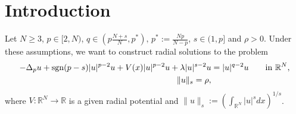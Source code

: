 \documentclass[11pt,reqno]{amsart}
\theoremstyle{definition}
\numberwithin{equation}{section}
\numberwithin{theorem}{section}
\numberwithin{equation}{section}
\numberwithin{theorem}{section}
\newcommand{\R}{\mathbb{R}}
\begin{document}
\section{Introduction}
Let $N\ge 3$, $p\in[2,N)$, $q\in(p\frac{N+s}{N},p^*),\,p^*:=\frac{Np}{N-p}$, $s\in(1,p]$ and $\rho>0$. Under these assumptions, we want to construct radial solutions to the problem
\begin{equation}\label{main-eq}
\begin{aligned}
-\Delta_p u+{\rm sgn}(p-s)|u|^{p-2}u+V(x)|u|^{p-2}u+\lambda |u|^{s-2}u&=|u|^{q-2}u\qquad\text{in $\R^N$,}  \\
\|u\|_s=\rho ,
\end{aligned}   
\end{equation}
where $V:\R^N\to\R$ is a given radial potential and $\|u\|_s:=\left(\int_{\R^N}|u|^sdx\right)^{1/s}$.\\
\end{document}
